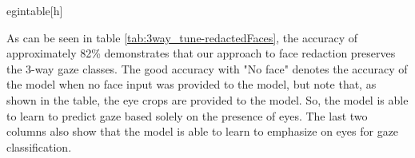 egin{table}[h]

As can be seen in table \ref{tab:3way_tune-redactedFaces}, the accuracy of approximately 82\% demonstrates that our approach to face redaction preserves the 3-way gaze classes. The good accuracy with "No face" denotes the accuracy of the model when no face input was provided to the model, but note that, as shown in the table, the eye crops are provided to the model. So, the model is able to learn to predict gaze based solely on the presence of eyes. The last two columns also show that the model is able to learn to emphasize on eyes for gaze classification.


